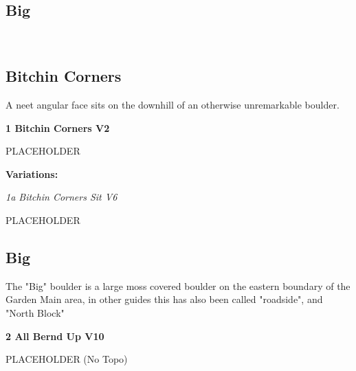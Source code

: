 \begin{multicols}{2}
		\section{Big}\label{sa:Big}
	\begin{minipage}{\columnwidth}
	\
	\end{minipage}

			\subsection*{Bitchin Corners}\label{bf:Bitchin Corners}
			\begin{minipage}{\columnwidth}
			A neet angular face sits on the downhill of an otherwise unremarkable boulder.
			\end{minipage}
			

					\begin{minipage}{\linewidth}	
					\label{rt:Bitchin Corners}\colorbox{green!20}{\textbf{1 Bitchin Corners V2  }}
					\begin{adjustwidth}{0.5cm}{}				
					PLACEHOLDER
					\end{adjustwidth}
					\end{minipage}
						\begin{adjustwidth}{0.5cm}{}				
						\textbf{Variations:} \newline
							\begin{minipage}{\linewidth}	
							\label{vr:Bitchin Corners Sit}\colorbox{RoyalBlue!20}{\emph{1a Bitchin Corners Sit V6  }}
							\begin{adjustwidth}{0.5cm}{}				
							PLACEHOLDER
							\end{adjustwidth}
							\end{minipage}
						\end{adjustwidth}
			\subsection*{Big}\label{bf:Big}
			\begin{minipage}{\columnwidth}
			The "Big" boulder is a large moss covered boulder on the eastern boundary of the Garden Main area, in other guides this has also been called "roadside", and "North Block"
			\end{minipage}
			
					\begin{minipage}{\linewidth}	
					\label{rt:All Bernd Up}\colorbox{red!20}{\textbf{2 All Bernd Up V10  }}
					\begin{adjustwidth}{0.5cm}{}				
					PLACEHOLDER
						\newline (No Topo) 
					\end{adjustwidth}
					\end{minipage}

\end{multicols}
